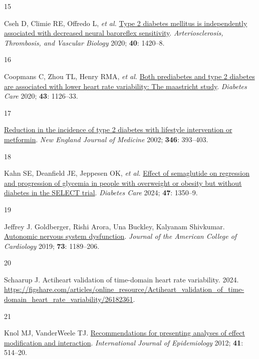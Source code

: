 \documentclass[
  a4paper,
  headsepline=true,
  open=any]{scrbook}
\newlength{\cslhangindent}
\newlength{\csllabelwidth}
\newlength{\cslentryspacingunit} %
\newenvironment{CSLReferences}[2] %
 {%
  \setlength{\parindent}{0pt}
  \ifodd #1
  \let\oldpar\par
  \def\par{\hangindent=\cslhangindent\oldpar}
  \fi
  \setlength{\parskip}{#2\cslentryspacingunit}
 }%
 {}
\newcommand{\CSLLeftMargin}[1]{\parbox[t]{\csllabelwidth}{#1}}
\newcommand{\CSLRightInline}[1]{\parbox[t]{\linewidth - \csllabelwidth}{#1}\break}
\begin{document}
\begin{CSLReferences}{0}{0}
\leavevmode{}%
\CSLLeftMargin{15 }%
\CSLRightInline{Cseh D, Climie RE, Offredo L, \emph{et al.}
\href{https://doi.org/10.1161/ATVBAHA.120.314102}{Type 2 diabetes
mellitus is independently associated with decreased neural baroreflex
sensitivity}. \emph{Arteriosclerosis, Thrombosis, and Vascular Biology}
2020; \textbf{40}: 1420--8.}

\leavevmode{}%
\CSLLeftMargin{16 }%
\CSLRightInline{Coopmans C, Zhou TL, Henry RMA, \emph{et al.}
\href{https://doi.org/10.2337/dc19-2367}{Both prediabetes and type 2
diabetes are associated with lower heart rate variability: The
maastricht study}. \emph{Diabetes Care} 2020; \textbf{43}: 1126--33.}

\leavevmode{}%
\CSLLeftMargin{17 }%
\CSLRightInline{\href{https://doi.org/10.1056/NEJMoa012512}{Reduction in
the incidence of type 2 diabetes with lifestyle intervention or
metformin}. \emph{New England Journal of Medicine} 2002; \textbf{346}:
393--403.}

\leavevmode{}%
\CSLLeftMargin{18 }%
\CSLRightInline{Kahn SE, Deanfield JE, Jeppesen OK, \emph{et al.}
\href{https://doi.org/10.2337/dc24-0491}{Effect of semaglutide on
regression and progression of glycemia in people with overweight or
obesity but without diabetes in the SELECT trial}. \emph{Diabetes Care}
2024; \textbf{47}: 1350--9.}

\leavevmode{}%
\CSLLeftMargin{19 }%
\CSLRightInline{Jeffrey J. Goldberger, Rishi Arora, Una Buckley,
Kalyanam Shivkumar.
\href{https://doi.org/doi:10.1016/j.jacc.2018.12.064}{Autonomic nervous
system dysfunction}. \emph{Journal of the American College of
Cardiology} 2019; \textbf{73}: 1189--206.}

\leavevmode{}%
\CSLLeftMargin{20 }%
\CSLRightInline{Schaarup J. Actiheart validation of time-domain heart
rate variability. 2024.
\url{https://figshare.com/articles/online_resource/Actiheart_validation_of_time-domain_heart_rate_variability/26182361}.}

\leavevmode{}%
\CSLLeftMargin{21 }%
\CSLRightInline{Knol MJ, VanderWeele TJ.
\href{https://doi.org/10.1093/ije/dyr218}{Recommendations for presenting
analyses of effect modification and interaction}. \emph{International
Journal of Epidemiology} 2012; \textbf{41}: 514--20.}


\end{CSLReferences}
\end{document}
